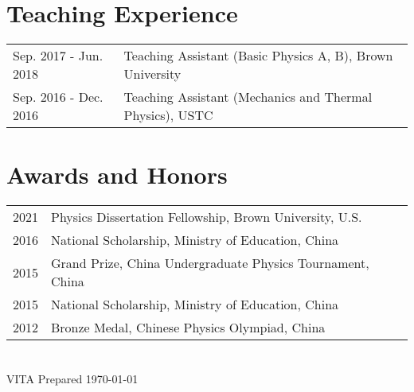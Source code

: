\documentclass[11pt,letterpaper]{article}
\begin{document}
\section*{Teaching Experience}
\vspace*{-0.15in}
\begin{longtable}{l p{\linewidth}}
    Sep. 2017 - Jun. 2018    & Teaching Assistant (Basic Physics A, B), Brown University \\
    Sep. 2016 - Dec. 2016    & Teaching Assistant (Mechanics and Thermal Physics), USTC
\end{longtable}

\section*{Awards and Honors}
\vspace*{-0.15in}
\begin{longtable}{l p{\linewidth}}
    2021 & Physics Dissertation Fellowship, Brown University, U.S.    \\
    2016 & National Scholarship, Ministry of Education, China         \\
    2015 & Grand Prize, China Undergraduate Physics Tournament, China \\
    2015 & National Scholarship, Ministry of Education, China         \\
    2012 & Bronze Medal, Chinese Physics Olympiad, China
\end{longtable}

\section*{}
VITA Prepared \today
\end{document}
